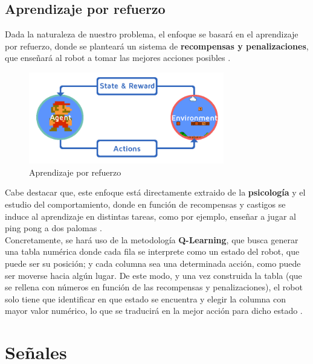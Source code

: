 \subsection{Aprendizaje por refuerzo}
\label{subsec:aprendizaje_por_refuerzo}

Dada la naturaleza de nuestro problema, el enfoque se basará en el aprendizaje por refuerzo, donde se planteará un sistema de \textbf{recompensas y penalizaciones}, que enseñará al robot a tomar las mejores acciones posibles \cite{learn}.\\

\begin{figure} [H]
	\begin{center}
	\includegraphics[height=4cm]{imagenes/cap1/9_reinforcement.png}
	\end{center}
	\caption[Aprendizaje por refuerzo]{Aprendizaje por refuerzo}
	\label{fig:reinforcement_learning}
\end{figure}

Cabe destacar que, este enfoque está directamente extraido de la \textbf{psicología} y el estudio del comportamiento, donde en función de recompensas y castigos se induce al aprendizaje en distintas tareas, como por ejemplo, enseñar a jugar al ping pong a dos palomas \cite{psicologia-aprendizaje} \cite{skinner}.\\

Concretamente, se hará uso de la metodología \textbf{Q-Learning}, que busca generar una tabla numérica donde cada fila se interprete como un estado del robot, que puede ser su posición; y cada columna sea una determinada acción, como puede ser moverse hacia algún lugar. De este modo, y una vez construida la tabla (que se rellena con números en función de las recompensas y penalizaciones), el robot solo tiene que identificar en que estado se encuentra y elegir la columna con mayor valor numérico, lo que se traducirá en la mejor acción para dicho estado \cite{q-learning}.

\newpage
\section{Señales}
\label{subsec:señales}

